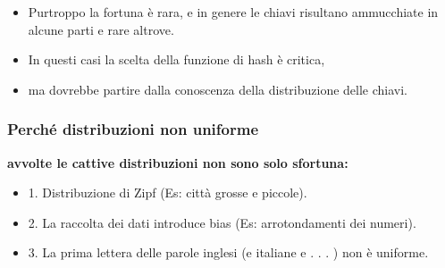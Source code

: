 \begin{itemize}
\begin{itemize}
    \end{itemize}
    
    \item Purtroppo la fortuna è rara, e in genere le chiavi risultano
    ammucchiate in alcune parti e rare altrove.
    \item In questi casi la scelta della funzione di hash è critica,
    \item ma dovrebbe partire dalla conoscenza della distribuzione
    delle chiavi.
\end{itemize}

\subsubsection{Perché distribuzioni non uniforme}
\textbf{avvolte le cattive distribuzioni non sono solo sfortuna:}
\begin{itemize}
    \item 1. Distribuzione di Zipf (Es: città grosse e piccole).
    \item 2. La raccolta dei dati introduce bias (Es: arrotondamenti dei
    numeri).
    \item 3. La prima lettera delle parole inglesi (e italiane e . . . ) non è
    uniforme.
\end{itemize}
